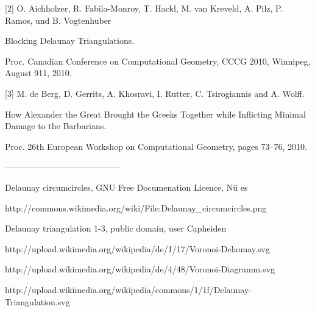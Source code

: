 \documentclass[a4paper,12pt]{article}
\begin{document}
[2] O. Aichholzer, R. Fabila-Monroy, T. Hackl, M. van Kreveld, A. Pilz, P. Ramos, und B. Vogtenhuber

Blocking Delaunay Triangulations. 

Proc. Canadian Conference on Computational Geometry, CCCG 2010, Winnipeg, August 9­11, 2010. 

[3] M. de Berg, D. Gerrits, A. Khosravi, I. Rutter, C. Tsirogiannis and A. Wolff.

How Alexander the Great Brought the Greeks Together while Inflicting Minimal Damage to the Barbarians.

Proc. 26th European Workshop on Computational Geometry, pages 73–76, 2010.

-----------------------------------------


Delaunay circumcircles, GNU Free Documenation Licence, Nü es

http://commons.wikimedia.org/wiki/File:Delaunay\_circumcircles.png


Delaunay triangulation 1-3, public domain, user Capheiden 

http://upload.wikimedia.org/wikipedia/de/1/17/Voronoi-Delaunay.svg

http://upload.wikimedia.org/wikipedia/de/4/48/Voronoi-Diagramm.svg

http://upload.wikimedia.org/wikipedia/commons/1/1f/Delaunay-Triangulation.svg
\end{document}
